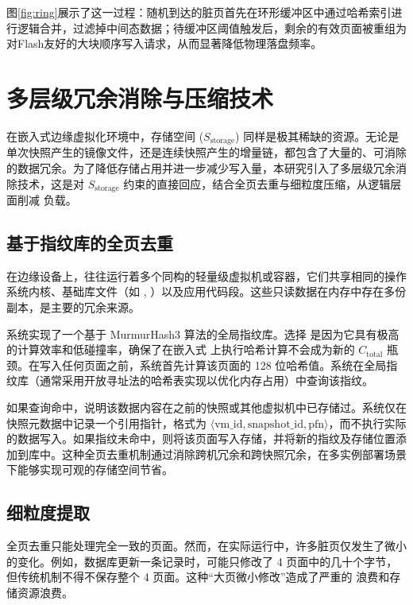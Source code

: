 图\ref{fig:ring}展示了这一过程：随机到达的脏页首先在环形缓冲区中通过哈希索引进行逻辑合并，过滤掉中间态数据；待缓冲区阈值触发后，剩余的有效页面被重组为对Flash友好的大块顺序写入请求，从而显著降低物理落盘频率。

\section{多层级冗余消除与压缩技术}

在嵌入式边缘虚拟化环境中，存储空间 ($S_{\text{storage}}$) 同样是极其稀缺的资源。无论是单次快照产生的镜像文件，还是连续快照产生的增量链，都包含了大量的、可消除的数据冗余。为了降低存储占用并进一步减少写入量，本研究引入了多层级冗余消除技术，这是对 $S_{\text{storage}}$ 约束的直接回应，结合全页去重与细粒度压缩，从逻辑层面削减  负载。

\subsection{基于指纹库的全页去重}

在边缘设备上，往往运行着多个同构的轻量级虚拟机或容器，它们共享相同的操作系统内核、基础库文件（如 , ）以及应用代码段\cite{barham2003xen, kivity2007kvm}。这些只读数据在内存中存在多份副本，是主要的冗余来源。

 系统实现了一个基于 MurmurHash3\cite{murmurhash3} 算法的全局指纹库。选择  是因为它具有极高的计算效率和低碰撞率，确保了在嵌入式  上执行哈希计算不会成为新的 $C_{\text{total}}$ 瓶颈。在写入任何页面之前，系统首先计算该页面的 128 位哈希值。系统在全局指纹库（通常采用开放寻址法的哈希表实现以优化内存占用）中查询该指纹。

如果查询命中，说明该数据内容在之前的快照或其他虚拟机中已存储过。系统仅在快照元数据中记录一个引用指针，格式为 $\langle\text{vm\_id}, \text{snapshot\_id}, \text{pfn}\rangle$，而不执行实际的数据写入。如果指纹未命中，则将该页面写入存储，并将新的指纹及存储位置添加到库中。这种全页去重机制通过消除跨机冗余和跨快照冗余，在多实例部署场景下能够实现可观的存储空间节省。

\subsection{细粒度提取}

全页去重只能处理完全一致的页面。然而，在实际运行中，许多脏页仅发生了微小的变化。例如，数据库更新一条记录时，可能只修改了 4 页面中的几十个字节，但传统机制不得不保存整个 4 页面。这种“大页微小修改”造成了严重的  浪费和存储资源浪费。

